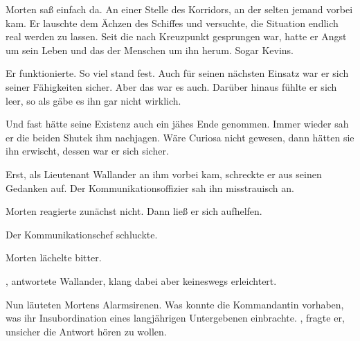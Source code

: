 Morten saß einfach da. An einer Stelle des Korridors, an der selten jemand vorbei kam. Er lauschte dem Ächzen des Schiffes und versuchte, die Situation endlich real werden zu lassen. Seit die  nach Kreuzpunkt gesprungen war, hatte er Angst um sein Leben und das der Menschen um ihn herum. Sogar Kevins.

\par

Er funktionierte. So viel stand fest. Auch für seinen nächsten Einsatz war er sich seiner Fähigkeiten sicher. Aber das war es auch. Darüber hinaus fühlte er sich leer, so als gäbe es ihn gar nicht wirklich.

\par

Und fast hätte seine Existenz auch ein jähes Ende genommen. Immer wieder sah er die beiden Shutek ihm nachjagen. Wäre Curiosa nicht gewesen, dann hätten sie ihn erwischt, dessen war er sich sicher.

\par

Erst, als Lieutenant Wallander an ihm vorbei kam, schreckte er aus seinen Gedanken auf. Der Kommunikationsoffizier sah ihn misstrauisch an. 

\par

Morten reagierte zunächst nicht. Dann ließ er sich aufhelfen. 

\par

Der Kommunikationschef schluckte. 

\par

Morten lächelte bitter. 

\par

, antwortete Wallander, klang dabei aber keineswegs erleichtert. 

\par

Nun läuteten Mortens Alarmsirenen. Was konnte die Kommandantin vorhaben, was ihr Insubordination eines langjährigen Untergebenen einbrachte. , fragte er, unsicher die Antwort hören zu wollen.

